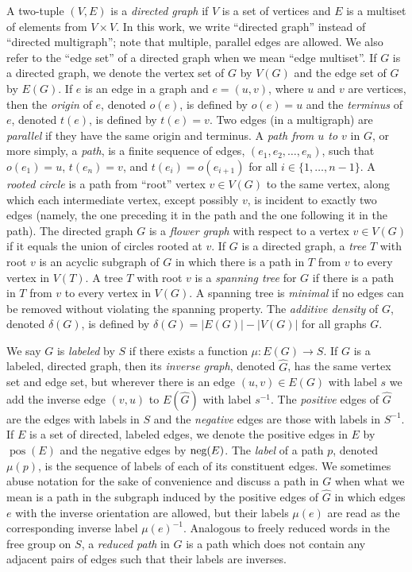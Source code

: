 \documentclass{article}
\DeclareMathOperator{\pos}{pos}
\newcommand{\nega}{\textnormal{neg}}
\begin{document}
A two-tuple $(V, E)$ is a \emph{directed graph} if $V$ is a set of vertices and $E$ is a multiset of elements from $V \times V$.
In this work, we write ``directed graph'' instead of ``directed multigraph''; note that multiple, parallel edges are allowed.
We also refer to the ``edge set'' of a directed graph when we mean ``edge multiset''.
If $G$ is a directed graph, we denote the vertex set of $G$ by $V(G)$ and the edge set of $G$ by $E(G)$.
If $e$ is an edge in a graph and $e = (u, v)$, where $u$ and $v$ are vertices, then the \emph{origin} of $e$, denoted $o(e)$, is defined by $o(e) = u$ and the \emph{terminus} of $e$, denoted $t(e)$, is defined by $t(e) = v$.
Two edges (in a multigraph) are \emph{parallel} if they have the same origin and terminus.
A \emph{path from $u$ to $v$} in $G$, or more simply, a \emph{path}, is a finite sequence of edges, $(e_1, e_2, \dotsc, e_n)$, such that $o(e_1) = u$, $t(e_n) = v$, and $t(e_i) = o(e_{i + 1})$ for all $i \in \{1, \dotsc, n - 1\}$.
A \emph{rooted circle} is a path from ``root'' vertex $v \in V(G)$ to the same vertex, along which each intermediate vertex, except possibly $v$, is incident to exactly two edges (namely, the one preceding it in the path and the one following it in the path).
The directed graph $G$ is a \emph{flower graph} with respect to a vertex $v \in V(G)$ if it equals the union of circles rooted at $v$.
If $G$ is a directed graph, a \emph{tree} $T$ with root $v$ is an acyclic subgraph of $G$ in which there is a path in $T$ from $v$ to every vertex in $V(T)$.
A tree $T$ with root $v$ is a \emph{spanning tree} for $G$ if there is a path in $T$ from $v$ to every vertex in $V(G)$.
A spanning tree is \emph{minimal} if no edges can be removed without violating the spanning property.
The \emph{additive density} of $G$, denoted $\delta(G)$, is defined by $\delta(G) = |E(G)| - |V(G)|$ for all graphs $G$.

We say $G$ is \emph{labeled} by $S$ if there exists a function $\mu \colon E(G) \to S$.
If $G$ is a labeled, directed graph, then its \emph{inverse graph}, denoted $\hat{G}$, has the same vertex set and edge set, but wherever there is an edge $(u, v) \in E(G)$ with label $s$ we add the inverse edge $(v, u)$ to $E(\hat{G})$ with label $s^{-1}$.
The \emph{positive} edges of $\hat{G}$ are the edges with labels in $S$ and the \emph{negative} edges are those with labels in $S^{-1}$.
If $E$ is a set of directed, labeled edges, we denote the positive edges in $E$ by $\pos(E)$ and the negative edges by $\nega(E)$.
The \emph{label} of a path $p$, denoted $\mu(p)$, is the sequence of labels of each of its constituent edges.
We sometimes abuse notation for the sake of convenience and discuss a path in $G$ when what we mean is a path in the subgraph induced by the positive edges of $\hat{G}$ in which edges $e$ with the inverse orientation are allowed, but their labels $\mu(e)$ are read as the corresponding inverse label $\mu(e)^{-1}$.
Analogous to freely reduced words in the free group on $S$, a \emph{reduced path} in $G$ is a path which does not contain any adjacent pairs of edges such that their labels are inverses.
\end{document}
